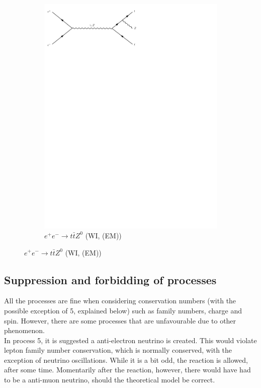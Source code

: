 \documentclass[11pt,a4paper]{article}
\begin{document}
\begin{figure}[h]
\begin{subfigure}[h]{0.3\textwidth}
		\includegraphics[trim={0.5cm 22cm 10cm 0cm},width=\textwidth]{../Diagrams/D20.pdf}
		\caption{$e^+e^- \rightarrow t\bar{t}Z^0$ (WI, (EM))}
		\label{fey:20}
	\end{subfigure}
\end{figure}

\subsection{Suppression and forbidding of processes}
All the processes are fine when considering conservation numbers (with the possible exception of 5, explained below) such as family numbers, charge and spin. However, there are some processes that are unfavourable due to other phenomenon.\\

In process 5, it is suggested a anti-electron neutrino is created. This would violate lepton family number conservation, which is normally conserved, with the exception of neutrino oscillations. While it is a bit odd, the reaction is allowed, after some time. Momentarily after the reaction, however, there would have had to be a anti-muon neutrino, should the theoretical model be correct.\\
\end{document}
